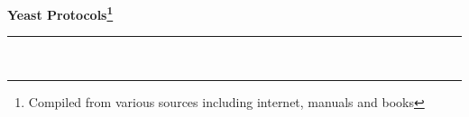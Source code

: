 \documentclass[a4paper,12pt] {book}%
\newcommand{\protocol}{Yeast Protocols}
\newcommand{\labtitle}{}
\newcommand{\authorname}{}
\begin{document}
 
 
 
\begin{titlepage}
\begin{center}
{\LARGE \textbf{\protocol\footnote{Compiled from various sources including internet, manuals and books}} \\ \vspace{4pt}}
\rule[13pt]{\textwidth}{1pt} \\ \vspace{150pt}
 
\end{center}
\end{titlepage}
 
\newpage
\thispagestyle{empty}           %
\setcounter{tocdepth}{2}
\tableofcontents
\clearpage                      %
 
\setcounter{page}{5}








%
\printindex
\end{document}
